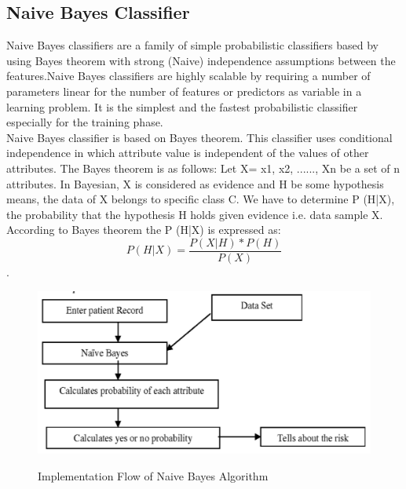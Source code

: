 \documentclass{book}
\begin{document}
    \subsection{Naive Bayes Classifier}
    	Naive  Bayes  classifiers  are a  family  of  simple  probabilistic classifiers based by using Bayes theorem with strong (Naive) independence  assumptions between  the features.Naive  Bayes classifiers are highly  scalable by requiring a number  of  parameters  linear  for  the number  of  features  or predictors as variable in a learning problem. It is the simplest and the fastest probabilistic classifier especially for the training phase.\\
    	Naive Bayes classifier is based on Bayes theorem. This classifier uses conditional independence in which attribute value is independent of the values of other attributes. The Bayes theorem is as follows:
    	Let X= {x1, x2, ......, Xn} be a set of n attributes. In Bayesian, X is considered as evidence and H be some hypothesis means, the data of X belongs to specific class C. We have to determine P (H|X), the probability that the hypothesis H holds given evidence i.e. data sample X. According to Bayes theorem the P (H|X) is expressed as: \\
    	\[P(H|X) = \frac{P(X|H) * P(H)}{P(X)}\].
    	
    	\begin{figure}[h]
    		\begin{center}
    			\includegraphics[width = 15cm]{images/naive_bayes.png}\\
    			\caption{Implementation Flow of Naive Bayes Algorithm}
    		\end{center}
    	\end{figure}
    	
\end{document}
